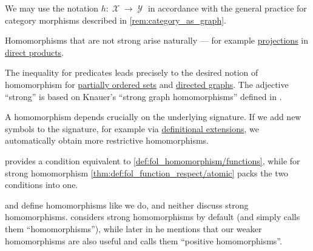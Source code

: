 \begin{comments}
  \item We may use the notation \( h: \mscrX \to \mscrY \) in accordance with the general practice for category morphisms described in \cref{rem:category_as_graph}.

  \item Homomorphisms that are not strong arise naturally --- for example \hyperref[def:cartesian_product_projection]{projections} in \hyperref[def:fol_direct_product]{direct products}.

  The inequality for predicates leads precisely to the desired notion of homomorphism for \hyperref[def:partially_ordered_set]{partially ordered sets} and \hyperref[def:directed_graph]{directed graphs}. The adjective \enquote{strong} is based on Knauer's \enquote{strong graph homomorphisms} defined in \cite[def. 1.4.3]{Knauer2019AlgebraicGraphTheory}.

  \item A homomorphism depends crucially on the underlying signature. If we add new symbols to the signature, for example via \hyperref[def:fol_definitional_extension]{definitional extensions}, we automatically obtain more restrictive homomorphisms.

  \item {} provides a condition equivalent to \cref{def:fol_homomorphism/functions}, while for strong homomorphism \cref{thm:def:fol_function_respect/atomic} packs the two conditions into one.

  \textcite[def. 3.3.1]{VanDalen2004LogicAndStructure} and \textcite[49]{Мальцев1970АлгебраическиеСистемы} define homomorphisms like we do, and neither discuss strong homomorphisms. \Textcite[def. 2.3.26(i)]{Hinman2005Logic} considers strong homomorphisms by default (and simply calls them \enquote{homomorphisms}), while later in \cite[rem. 2.3.27]{Hinman2005Logic} he mentions that our weaker homomorphisms are also useful and calls them \enquote{positive homomorphisms}.
\end{comments}


